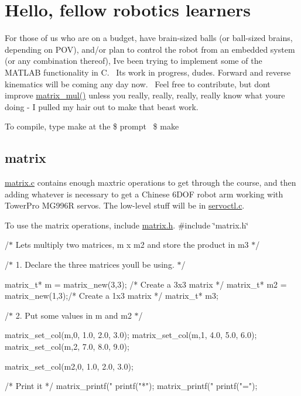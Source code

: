\section*{Hello, fellow robotics learners}

For those of us who are on a budget, have brain-\/sized balls (or ball-\/sized brains, depending on P\+OV), and/or plan to control the robot from an embedded system (or any combination thereof), I\textquotesingle{}ve been trying to implement some of the M\+A\+T\+L\+AB functionality in C.~\newline
 I\textquotesingle{}ts work in progress, dudes. Forward and reverse kinematics will be coming any day now.~\newline
 Feel free to contribute, but don\textquotesingle{}t improve \hyperlink{matrix_8c_a1e8d8c0421f716763d5bbb5c39af0e5b}{matrix\+\_\+mul()} unless you really, really, really, really know what you\textquotesingle{}re doing -\/ I pulled my hair out to make that beast work.

To compile, type make at the \$ prompt~\newline
 \$ make

\subsection*{matrix}

\hyperlink{matrix_8c}{matrix.\+c} contains enough maxtric operations to get through the course, and then adding whatever is necessary to get a Chinese 6\+D\+OF robot arm working with Tower\+Pro M\+G996R servos. The low-\/level stuff will be in \hyperlink{servoctl_8c}{servoctl.\+c}.

To use the matrix operations, include \hyperlink{matrix_8h}{matrix.\+h}. {\ttfamily  \#include \char`\"{}matrix.\+h\char`\"{}}

{\ttfamily /$\ast$ Let\textquotesingle{}s multiply two matrices, m x m2 and store the product in m3 $\ast$/}

{\ttfamily /$\ast$ 1. Declare the three matrices you\textquotesingle{}ll be using. $\ast$/ \begin{DoxyVerb}matrix_t* m = matrix_new(3,3); /* Create a 3x3 matrix */
matrix_t* m2 = matrix_new(1,3);/* Create a 1x3 matrix */
matrix_t* m3;
\end{DoxyVerb}
}

{\ttfamily /$\ast$ 2. Put some values in m and m2 $\ast$/ \begin{DoxyVerb}matrix_set_col(m,0, 1.0, 2.0, 3.0);
matrix_set_col(m,1, 4.0, 5.0, 6.0);
matrix_set_col(m,2, 7.0, 8.0, 9.0);

matrix_set_col(m2,0, 1.0, 2.0, 3.0);

/* Print it */
matrix_printf("%
printf("*\n");
matrix_printf("%
printf("=\n");
\end{DoxyVerb}
}

